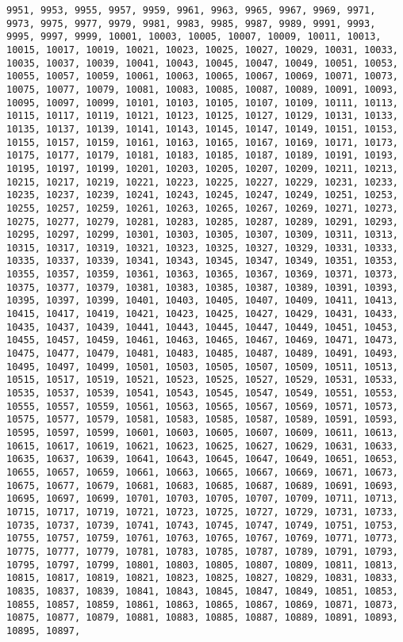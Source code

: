 \documentclass[11pt]{article}
\begin{document}
\begin{Verbatim}[commandchars=\\\{\}]
9951, 9953, 9955, 9957, 9959, 9961, 9963, 9965, 9967, 9969, 9971, 9973, 9975, 9977, 9979, 9981, 9983, 9985, 9987, 9989, 9991, 9993, 9995, 9997, 9999, 10001, 10003, 10005, 10007, 10009, 10011, 10013, 10015, 10017, 10019, 10021, 10023, 10025, 10027, 10029, 10031, 10033, 10035, 10037, 10039, 10041, 10043, 10045, 10047, 10049, 10051, 10053, 10055, 10057, 10059, 10061, 10063, 10065, 10067, 10069, 10071, 10073, 10075, 10077, 10079, 10081, 10083, 10085, 10087, 10089, 10091, 10093, 10095, 10097, 10099, 10101, 10103, 10105, 10107, 10109, 10111, 10113, 10115, 10117, 10119, 10121, 10123, 10125, 10127, 10129, 10131, 10133, 10135, 10137, 10139, 10141, 10143, 10145, 10147, 10149, 10151, 10153, 10155, 10157, 10159, 10161, 10163, 10165, 10167, 10169, 10171, 10173, 10175, 10177, 10179, 10181, 10183, 10185, 10187, 10189, 10191, 10193, 10195, 10197, 10199, 10201, 10203, 10205, 10207, 10209, 10211, 10213, 10215, 10217, 10219, 10221, 10223, 10225, 10227, 10229, 10231, 10233, 10235, 10237, 10239, 10241, 10243, 10245, 10247, 10249, 10251, 10253, 10255, 10257, 10259, 10261, 10263, 10265, 10267, 10269, 10271, 10273, 10275, 10277, 10279, 10281, 10283, 10285, 10287, 10289, 10291, 10293, 10295, 10297, 10299, 10301, 10303, 10305, 10307, 10309, 10311, 10313, 10315, 10317, 10319, 10321, 10323, 10325, 10327, 10329, 10331, 10333, 10335, 10337, 10339, 10341, 10343, 10345, 10347, 10349, 10351, 10353, 10355, 10357, 10359, 10361, 10363, 10365, 10367, 10369, 10371, 10373, 10375, 10377, 10379, 10381, 10383, 10385, 10387, 10389, 10391, 10393, 10395, 10397, 10399, 10401, 10403, 10405, 10407, 10409, 10411, 10413, 10415, 10417, 10419, 10421, 10423, 10425, 10427, 10429, 10431, 10433, 10435, 10437, 10439, 10441, 10443, 10445, 10447, 10449, 10451, 10453, 10455, 10457, 10459, 10461, 10463, 10465, 10467, 10469, 10471, 10473, 10475, 10477, 10479, 10481, 10483, 10485, 10487, 10489, 10491, 10493, 10495, 10497, 10499, 10501, 10503, 10505, 10507, 10509, 10511, 10513, 10515, 10517, 10519, 10521, 10523, 10525, 10527, 10529, 10531, 10533, 10535, 10537, 10539, 10541, 10543, 10545, 10547, 10549, 10551, 10553, 10555, 10557, 10559, 10561, 10563, 10565, 10567, 10569, 10571, 10573, 10575, 10577, 10579, 10581, 10583, 10585, 10587, 10589, 10591, 10593, 10595, 10597, 10599, 10601, 10603, 10605, 10607, 10609, 10611, 10613, 10615, 10617, 10619, 10621, 10623, 10625, 10627, 10629, 10631, 10633, 10635, 10637, 10639, 10641, 10643, 10645, 10647, 10649, 10651, 10653, 10655, 10657, 10659, 10661, 10663, 10665, 10667, 10669, 10671, 10673, 10675, 10677, 10679, 10681, 10683, 10685, 10687, 10689, 10691, 10693, 10695, 10697, 10699, 10701, 10703, 10705, 10707, 10709, 10711, 10713, 10715, 10717, 10719, 10721, 10723, 10725, 10727, 10729, 10731, 10733, 10735, 10737, 10739, 10741, 10743, 10745, 10747, 10749, 10751, 10753, 10755, 10757, 10759, 10761, 10763, 10765, 10767, 10769, 10771, 10773, 10775, 10777, 10779, 10781, 10783, 10785, 10787, 10789, 10791, 10793, 10795, 10797, 10799, 10801, 10803, 10805, 10807, 10809, 10811, 10813, 10815, 10817, 10819, 10821, 10823, 10825, 10827, 10829, 10831, 10833, 10835, 10837, 10839, 10841, 10843, 10845, 10847, 10849, 10851, 10853, 10855, 10857, 10859, 10861, 10863, 10865, 10867, 10869, 10871, 10873, 10875, 10877, 10879, 10881, 10883, 10885, 10887, 10889, 10891, 10893, 10895, 10897, 
\end{Verbatim}
\end{document}

